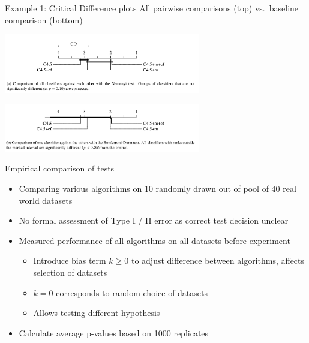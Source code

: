\documentclass[aspectratio=169,12pt]{beamer}
\providecommand{\tightlist}{%
  \setlength{\itemsep}{2pt}\setlength{\parskip}{0pt}}
\begin{document}
\begin{frame}{Example 1: Critical Difference plots}
\label{example-1-critical-difference-plots}
All pairwise comparisons (top) vs.~baseline comparison (bottom)

\begin{center}
\includegraphics[width=3.38in,height=\textheight]{img/fig1-a.png}
\end{center}

\begin{center}
\includegraphics[width=3.36in,height=\textheight]{img/fig1-b.png}
\end{center}
\end{frame}

\begin{frame}{Empirical comparison of tests}
\label{empirical-comparison-of-tests}
\begin{itemize}[<+->]
\tightlist
\item
  Comparing various algorithms on 10 randomly drawn out of pool of 40
  real world datasets
\item
  No formal assessment of Type I / II error as correct test decision
  unclear
\item
  Measured performance of all algorithms on all datasets before
  experiment

  \begin{itemize}[<+->]
  \tightlist
  \item
    Introduce bias term \(k \geq 0\) to adjust difference between
    algorithms, affects selection of datasets
  \item
    \(k = 0\) corresponds to random choice of datasets
  \item
    Allows testing different hypothesis
  \end{itemize}
\item
  Calculate average p-values based on 1000 replicates
\end{itemize}
\end{frame}
\end{document}
